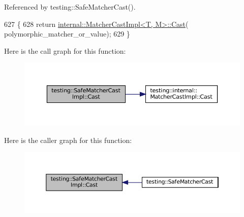 Referenced by testing\+::\+Safe\+Matcher\+Cast().


\begin{DoxyCode}
627                                                                        \{
628     \textcolor{keywordflow}{return} \hyperlink{classtesting_1_1internal_1_1MatcherCastImpl_a488bb69a7845f9198bbb198d8dbe41a8}{internal::MatcherCastImpl<T, M>::Cast}(
      polymorphic\_matcher\_or\_value);
629   \}
\end{DoxyCode}
Here is the call graph for this function\+:
\nopagebreak
\begin{figure}[H]
\begin{center}
\leavevmode
\includegraphics[width=350pt]{classtesting_1_1SafeMatcherCastImpl_a6ceab2bd71bff1677ed184eb2afa8653_cgraph}
\end{center}
\end{figure}
Here is the caller graph for this function\+:
\nopagebreak
\begin{figure}[H]
\begin{center}
\leavevmode
\includegraphics[width=350pt]{classtesting_1_1SafeMatcherCastImpl_a6ceab2bd71bff1677ed184eb2afa8653_icgraph}
\end{center}
\end{figure}
\mbox{\label{classtesting_1_1SafeMatcherCastImpl_a034691f9eab929b8b25c33f13937ab95}} 
